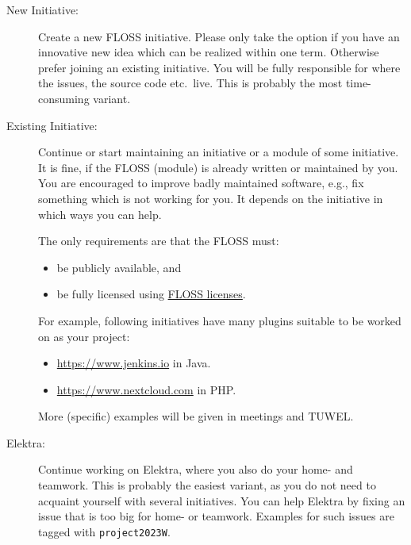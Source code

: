 \documentclass[11pt,a4paper]{article}
\def\myterm{2023W}
\begin{document}
\begin{description}
\item[New Initiative:] Create a new FLOSS initiative.
	Please only take the option if you have an innovative new idea which can be realized within one term.
	Otherwise prefer joining an existing initiative.
	You will be fully responsible for where the issues, the source code etc.\ live.
	This is probably the most time-consuming variant.
\item[Existing Initiative:]
	Continue or start maintaining an initiative or a module of some initiative.
	It is fine, if the FLOSS (module) is already written or maintained by you.
	You are encouraged to improve badly maintained software, e.g., fix something which is not working for you.
	It depends on the initiative in which ways you can help.

	The only requirements are that the FLOSS must:
	\begin{itemize}
	\item be publicly available, and
	\item be fully licensed using \href{https://www.gnu.org/licenses/license-list}{FLOSS licenses}.
	\end{itemize}

	For example, following initiatives have many plugins suitable to be worked on as your project:
	\begin{itemize}
	\item \url{https://www.jenkins.io} in Java.
	\item \url{https://www.nextcloud.com} in PHP.
	\end{itemize}
	More (specific) examples will be given in meetings and TUWEL.
\item[Elektra:]
	Continue working on Elektra, where you also do your home- and teamwork.
	This is probably the easiest variant, as you do not need to acquaint yourself with several initiatives.
	You can help Elektra by fixing an issue that is too big for home- or teamwork.
	Examples for such issues are tagged with {\tt project\myterm}.
\end{description}

\newpage

\renewcommand{\thesection}{H0 Registration}
\end{document}
